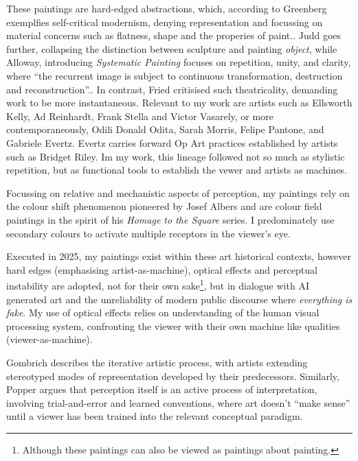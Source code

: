\documentclass[12pt]{article}
\begin{document}
These paintings are hard-edged abstractions, which, according to
Greenberg exemplfies self-critical modernism, denying representation
and focussing on material concerns such as flatness, shape and the
properies of paint.\cite[p. 85-93]{Greenberg1961}. Judd goes further,
collapsing the distinction between sculpture and painting
\emph{object}\cite{Judd1965}, while Alloway, introducing
\emph{Systematic Painting} focuses on repetition, unity, and clarity,
where ``the recurrent image is subject to continuous transformation,
destruction and reconstruction''.\cite[pp. 18-19]{Alloway1975}. In
contrast, Fried critisised such theatricality, demanding work to be
more instantaneous.\cite[p. 12-23]{Fried1968} Relevant to my work are
artists such as Ellsworth Kelly, Ad Reinhardt, Frank Stella and Victor
Vasarely, or more contemporaneously, Odili Donald Odita, Sarah Morris,
Felipe Pantone, and Gabriele Evertz. Evertz carries forward Op Art
practices\cite{Follin2004EmbodiedVisions,Seitz1965ResponsiveEye}
established by artists such as Bridget
Riley.\cite{Riley2019EyesMind,Riley2019DialoguesOnArt} Im my work,
this lineage followed not so much as stylistic repetition, but as
functional tools to establish the vewer and artists as machines.

Focussing on relative and mechanistic aspects of perception, my
paintings rely on the colour shift phenomenon pioneered by Josef
Albers\cite{albers} and are colour field paintings in the spirit of
his \emph{Homage to the Square} series. I predominately use secondary
colours to activate multiple receptors in the viewer's
eye.\cite{HurvichJameson1957,Land1977,SchnapfKraftBaylor1987}

Executed in 2025, my paintings exist within these art historical
contexts, however hard edges (emphasising artist-as-machine), 
optical effects and perceptual instability are adopted, not for their
own sake\footnote{Although these paintings can also be viewed as
  paintings about painting.}, but in dialogue with AI generated art
and the unreliability of modern public discourse where \emph{everything is
fake}. My use of optical effects relies on understanding of the human
visual processing system, confronting the viewer with their own
machine like qualities (viewer-as-machine).

Gombrich describes the iterative artistic process, with artists
extending stereotyped modes of representation developed by their
predecessors.\cite[Chapters II, V]{gombrich1960art} Similarly, Popper
argues that perception itself is an active process of interpretation,
involving trial-and-error and learned conventions, where art doesn't
``make sense'' until a viewer has been trained into the relevant
conceptual paradigm.\cite[Chapter 2]{popper1972objective}
\end{document}

